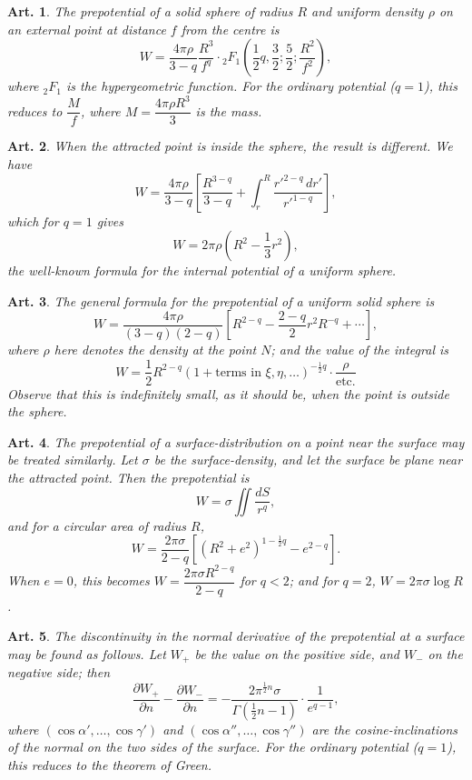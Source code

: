 \documentclass[12pt,a4paper]{article}
\theoremstyle{cayley}
\newtheorem{art}{Art.}[section]
\begin{document}
\begin{art}
The prepotential of a solid sphere of radius $R$ and uniform density $\rho$ on an external point at distance $f$ from the centre is
\[
W = \frac{4\pi\rho}{3-q}\frac{R^3}{f^q} \cdot {}_2F_1\left(\frac{1}{2}q, \frac{3}{2}; \frac{5}{2}; \frac{R^2}{f^2}\right),
\]
where ${}_2F_1$ is the hypergeometric function. For the ordinary potential ($q=1$), this reduces to $\dfrac{M}{f}$, where $M = \dfrac{4\pi\rho R^3}{3}$ is the mass.
\end{art}

\begin{art}
When the attracted point is inside the sphere, the result is different. We have
\[
W = \frac{4\pi\rho}{3-q}\left[\frac{R^{3-q}}{3-q} + \int_r^R \frac{r'^{2-q}\,dr'}{r'^{1-q}}\right],
\]
which for $q=1$ gives
\[
W = 2\pi\rho\left(R^2 - \frac{1}{3}r^2\right),
\]
the well-known formula for the internal potential of a uniform sphere.
\end{art}

\begin{art}
The general formula for the prepotential of a uniform solid sphere is
\[
W = \frac{4\pi\rho}{(3-q)(2-q)}\left[R^{2-q} - \frac{2-q}{2}r^2 R^{-q} + \cdots\right],
\]
where $\rho$ here denotes the density at the point $N$; and the value of the integral is
\[
W = \frac{1}{2}R^{2-q}(1 + \text{terms in } \xi, \eta, \ldots)^{-\frac{1}{2}q} \cdot \frac{\rho}{\text{etc.}}
\]
Observe that this is indefinitely small, as it should be, when the point is outside the sphere.
\end{art}

\begin{art}
The prepotential of a surface-distribution on a point near the surface may be treated similarly. Let $\sigma$ be the surface-density, and let the surface be plane near the attracted point. Then the prepotential is
\[
W = \sigma \iint \frac{dS}{r^q},
\]
and for a circular area of radius $R$,
\[
W = \frac{2\pi\sigma}{2-q}\left[(R^2+e^2)^{1-\frac{1}{2}q} - e^{2-q}\right].
\]
When $e = 0$, this becomes $W = \dfrac{2\pi\sigma R^{2-q}}{2-q}$ for $q < 2$; and for $q = 2$, $W = 2\pi\sigma\log R$.
\end{art}

\begin{art}
The discontinuity in the normal derivative of the prepotential at a surface may be found as follows. Let $W_+$ be the value on the positive side, and $W_-$ on the negative side; then
\[
\frac{\partial W_+}{\partial n} - \frac{\partial W_-}{\partial n} = -\frac{2\pi^{\frac{1}{2}n}\sigma}{\Gamma(\frac{1}{2}n - 1)} \cdot \frac{1}{e^{q-1}},
\]
where $(\cos\alpha', \ldots, \cos\gamma')$ and $(\cos\alpha'', \ldots, \cos\gamma'')$ are the cosine-inclinations of the normal on the two sides of the surface. For the ordinary potential ($q=1$), this reduces to the theorem of Green.
\end{art}
\end{document}
